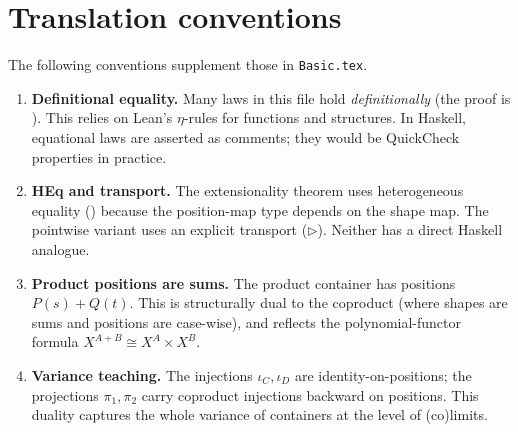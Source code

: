 \documentclass[11pt,a4paper]{article}
\begin{document}
\section{Translation conventions}

The following conventions supplement those in \texttt{Basic.tex}.

\begin{enumerate}
\item \textbf{Definitional equality.}  Many laws in this file hold
  \emph{definitionally} (the proof is ).  This relies on Lean's
  $\eta$-rules for functions and structures.  In Haskell, equational laws are
  asserted as comments; they would be QuickCheck properties in practice.

\item \textbf{HEq and transport.}  The extensionality theorem
   uses heterogeneous equality () because
  the position-map type depends on the shape map.  The pointwise variant
   uses an explicit transport ($\triangleright$).  Neither has a direct
  Haskell analogue.

\item \textbf{Product positions are sums.}  The product container has positions
  $P(s) + Q(t)$.  This is structurally dual to the coproduct (where shapes are
  sums and positions are case-wise), and reflects the polynomial-functor
  formula $X^{A+B} \cong X^A \times X^B$.

\item \textbf{Variance teaching.}  The injections $\iota_C, \iota_D$ are
  identity-on-positions; the projections $\pi_1, \pi_2$ carry coproduct
  injections backward on positions.  This duality captures the whole variance
  of containers at the level of (co)limits.
\end{enumerate}
\end{document}
